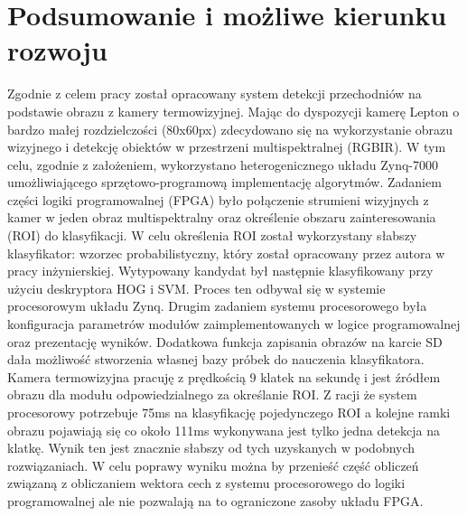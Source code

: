 \chapter{Podsumowanie i możliwe kierunku rozwoju}
Zgodnie z celem pracy został opracowany system detekcji przechodniów na podstawie obrazu z kamery termowizyjnej. Mając do dyspozycji kamerę Lepton o bardzo małej rozdzielczości (80x60px) zdecydowano się na wykorzystanie obrazu wizyjnego i detekcję obiektów w przestrzeni multispektralnej (RGBIR). W tym celu, zgodnie z założeniem, wykorzystano heterogenicznego układu Zynq-7000 umożliwiającego sprzętowo-programową implementację algorytmów. Zadaniem części logiki programowalnej (FPGA) było połączenie strumieni wizyjnych z kamer w jeden obraz multispektralny oraz określenie obszaru zainteresowania (ROI) do klasyfikacji. W celu określenia ROI został wykorzystany słabszy klasyfikator: wzorzec probabilistyczny, który został opracowany przez autora w pracy inżynierskiej. Wytypowany kandydat był następnie klasyfikowany przy użyciu deskryptora HOG i SVM. Proces ten odbywał się w systemie procesorowym układu Zynq. Drugim zadaniem systemu procesorowego była konfiguracja parametrów modułów zaimplementowanych w logice programowalnej oraz prezentację wyników. Dodatkowa funkcja zapisania obrazów na karcie SD dała możliwość stworzenia własnej bazy próbek do nauczenia klasyfikatora. 
Kamera termowizyjna pracuję z prędkością 9 klatek na sekundę i jest źródłem obrazu dla modułu odpowiedzialnego za określanie ROI. Z racji że system procesorowy potrzebuje 75ms na klasyfikację pojedynczego ROI a kolejne ramki obrazu pojawiają się co około 111ms wykonywana jest tylko jedna detekcja na klatkę. Wynik ten jest znacznie słabszy od tych uzyskanych w podobnych rozwiązaniach.  W celu poprawy wyniku można by przenieść część obliczeń związaną z obliczaniem wektora cech z systemu procesorowego do logiki programowalnej ale nie pozwalają na to ograniczone zasoby układu FPGA.
